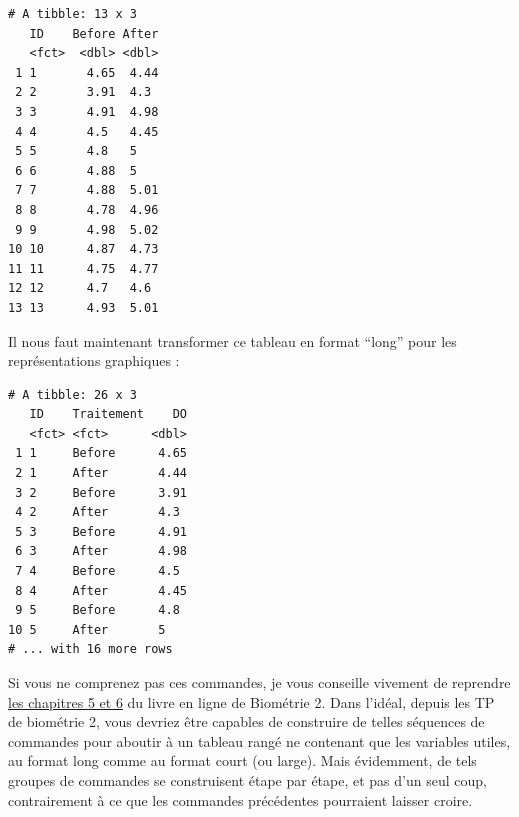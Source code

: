 \documentclass[
  a4paper,
]{article}
\newenvironment{Shaded}{\begin{snugshade}}{\end{snugshade}}
\newcommand{\DataTypeTok}[1]{\textcolor[rgb]{0.00,0.34,0.68}{#1}}
\newcommand{\KeywordTok}[1]{\textcolor[rgb]{0.12,0.11,0.11}{\textbf{#1}}}
\newcommand{\NormalTok}[1]{\textcolor[rgb]{0.12,0.11,0.11}{#1}}
\newcommand{\OperatorTok}[1]{\textcolor[rgb]{0.12,0.11,0.11}{#1}}
\newcommand{\StringTok}[1]{\textcolor[rgb]{0.75,0.01,0.01}{#1}}
\begin{document}
\begin{verbatim}
# A tibble: 13 x 3
   ID    Before After
   <fct>  <dbl> <dbl>
 1 1       4.65  4.44
 2 2       3.91  4.3 
 3 3       4.91  4.98
 4 4       4.5   4.45
 5 5       4.8   5   
 6 6       4.88  5   
 7 7       4.88  5.01
 8 8       4.78  4.96
 9 9       4.98  5.02
10 10      4.87  4.73
11 11      4.75  4.77
12 12      4.7   4.6 
13 13      4.93  5.01
\end{verbatim}

Il nous faut maintenant transformer ce tableau en format ``long'' pour les représentations graphiques :

\begin{Shaded}
\end{Shaded}

\begin{verbatim}
# A tibble: 26 x 3
   ID    Traitement    DO
   <fct> <fct>      <dbl>
 1 1     Before      4.65
 2 1     After       4.44
 3 2     Before      3.91
 4 2     After       4.3 
 5 3     Before      4.91
 6 3     After       4.98
 7 4     Before      4.5 
 8 4     After       4.45
 9 5     Before      4.8 
10 5     After       5   
# ... with 16 more rows
\end{verbatim}

Si vous ne comprenez pas ces commandes, je vous conseille vivement de reprendre \href{https://besibo.github.io/DA/tidyr.html}{les chapitres 5 et 6} du livre en ligne de Biométrie 2. Dans l'idéal, depuis les TP de biométrie 2, vous devriez être capables de construire de telles séquences de commandes pour aboutir à un tableau rangé ne contenant que les variables utiles, au format long comme au format court (ou large). Mais évidemment, de tels groupes de commandes se construisent étape par étape, et pas d'un seul coup, contrairement à ce que les commandes précédentes pourraient laisser croire.
\end{document}
